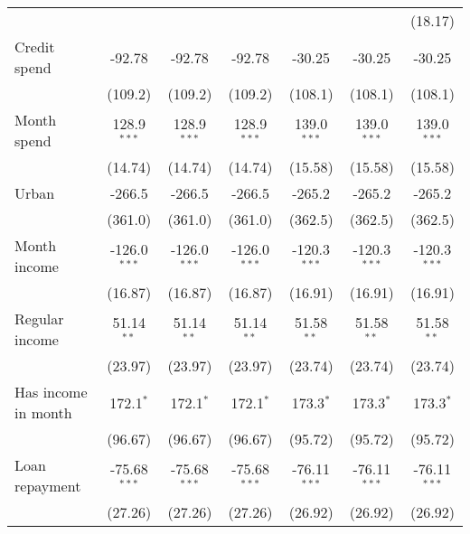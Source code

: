 \begin{table}[htbp]
\begin{threeparttable}[b]
\begin{tabular}{lcccccc}
                                 &                &                &                &                 &                  & (18.17)\\   
         Credit spend            & -92.78         & -92.78         & -92.78         & -30.25          & -30.25           & -30.25\\   
                                 & (109.2)        & (109.2)        & (109.2)        & (108.1)         & (108.1)          & (108.1)\\   
         Month spend             & 128.9$^{***}$  & 128.9$^{***}$  & 128.9$^{***}$  & 139.0$^{***}$   & 139.0$^{***}$    & 139.0$^{***}$\\   
                                 & (14.74)        & (14.74)        & (14.74)        & (15.58)         & (15.58)          & (15.58)\\   
         Urban                   & -266.5         & -266.5         & -266.5         & -265.2          & -265.2           & -265.2\\   
                                 & (361.0)        & (361.0)        & (361.0)        & (362.5)         & (362.5)          & (362.5)\\   
         Month income            & -126.0$^{***}$ & -126.0$^{***}$ & -126.0$^{***}$ & -120.3$^{***}$  & -120.3$^{***}$   & -120.3$^{***}$\\   
                                 & (16.87)        & (16.87)        & (16.87)        & (16.91)         & (16.91)          & (16.91)\\   
         Regular income          & 51.14$^{**}$   & 51.14$^{**}$   & 51.14$^{**}$   & 51.58$^{**}$    & 51.58$^{**}$     & 51.58$^{**}$\\   
                                 & (23.97)        & (23.97)        & (23.97)        & (23.74)         & (23.74)          & (23.74)\\   
         Has income in month     & 172.1$^{*}$    & 172.1$^{*}$    & 172.1$^{*}$    & 173.3$^{*}$     & 173.3$^{*}$      & 173.3$^{*}$\\   
                                 & (96.67)        & (96.67)        & (96.67)        & (95.72)         & (95.72)          & (95.72)\\   
         Loan repayment          & -75.68$^{***}$ & -75.68$^{***}$ & -75.68$^{***}$ & -76.11$^{***}$  & -76.11$^{***}$   & -76.11$^{***}$\\   
                                 & (27.26)        & (27.26)        & (27.26)        & (26.92)         & (26.92)          & (26.92)\\   

\end{tabular}
\end{threeparttable}
\end{table}
